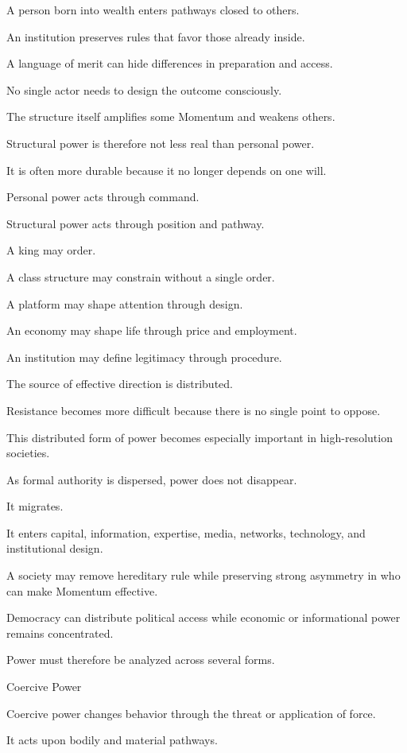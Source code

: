 A person born into wealth enters pathways closed to others.

An institution preserves rules that favor those already inside.

A language of merit can hide differences in preparation and access.

No single actor needs to design the outcome consciously.

The structure itself amplifies some Momentum and weakens others.

Structural power is therefore not less real than personal power.

It is often more durable because it no longer depends on one will.

Personal power acts through command.

Structural power acts through position and pathway.

A king may order.

A class structure may constrain without a single order.

A platform may shape attention through design.

An economy may shape life through price and employment.

An institution may define legitimacy through procedure.

The source of effective direction is distributed.

Resistance becomes more difficult because there is no single point to oppose.

This distributed form of power becomes especially important in high-resolution societies.

As formal authority is dispersed, power does not disappear.

It migrates.

It enters capital, information, expertise, media, networks, technology, and institutional design.

A society may remove hereditary rule while preserving strong asymmetry in who can make Momentum effective.

Democracy can distribute political access while economic or informational power remains concentrated.

Power must therefore be analyzed across several forms.

Coercive Power

Coercive power changes behavior through the threat or application of force.

It acts upon bodily and material pathways.

